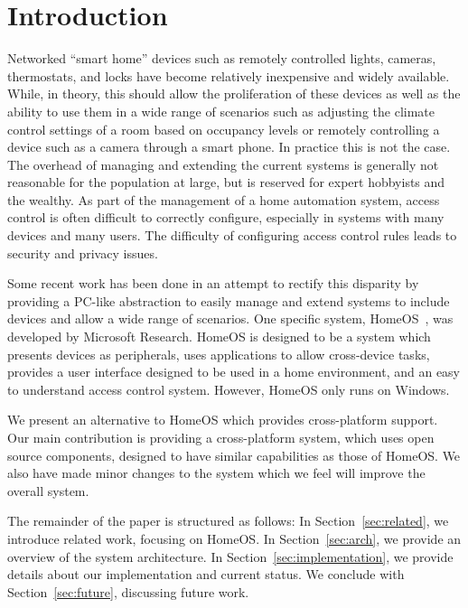 \section{Introduction}
\label{sec:intro}
Networked ``smart home'' devices such as remotely controlled lights, cameras,
thermostats, and locks have become relatively inexpensive and widely available.
While, in theory, this should allow the proliferation of these devices as well
as the ability to use them in a wide range of scenarios such as adjusting the
climate control settings of a room based on occupancy levels or remotely
controlling a device such as a camera through a smart phone. In practice this is
not the case. The overhead of managing and extending the current systems is
generally not reasonable for the population at large, but is reserved for
expert hobbyists and the wealthy. As part of the management of a home automation
system, access control is often difficult to correctly configure, especially in
systems with many devices and many users. The difficulty of configuring access
control rules leads to security and privacy issues.

Some recent work has been done in an attempt to rectify this disparity by
providing a PC-like abstraction to easily manage and extend systems to include
devices and allow a wide range of scenarios. One specific system,
HomeOS~\cite{homeOS}, was developed by Microsoft Research. HomeOS is designed to
be a system which presents devices as peripherals, uses applications to allow
cross-device tasks, provides a user interface designed to be used in a home
environment, and an easy to understand access control system. However, HomeOS
only runs on Windows.

We present an alternative to HomeOS which provides cross-platform support. Our
main contribution is providing a cross-platform system, which uses open source
components, designed to have similar capabilities as those of HomeOS. We also
have made minor changes to the system which we feel will improve the overall
system.

The remainder of the paper is structured as follows: In
Section~\ref{sec:related}, we introduce related work, focusing on HomeOS. In
Section~\ref{sec:arch}, we provide an overview of the system architecture. In
Section~\ref{sec:implementation}, we provide details about our implementation
and current status. We conclude with Section~\ref{sec:future}, discussing future
work.